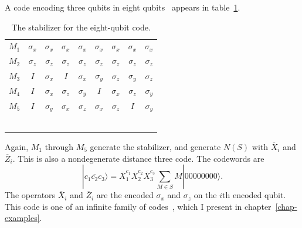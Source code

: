 \documentclass{report}
\newcommand{\ket}[1]{|{#1}\rangle}
\newcommand{\X}{\sigma_x}
\newcommand{\Z}{\sigma_z}
\newcommand{\Y}{\sigma_y}
\newcommand{\Xbar}{\overline{X}}
\newcommand{\Zbar}{\overline{Z}}
\newcommand{\Sum}{\sum}
\newcommand{\low}[1]{\raisebox{-0.3ex}{{#1}}}
\begin{document}
A code encoding three qubits in eight 
qubits~\cite{gottesman-stab,calderbank-stab,steane-8qubit} appears in 
table~\ref{table-8qubit}.
\begin{table}
\centering
\begin{tabular}{c|cccccccc}
$M_1$ & $\X$ & $\X$ & $\X$ & $\X$ & $\X$ & $\X$ & $\X$ & $\X$ \\
$M_2$ & $\Z$ & $\Z$ & $\Z$ & $\Z$ & $\Z$ & $\Z$ & $\Z$ & $\Z$ \\
$M_3$ & $I$ & $\X$ & $I$ & $\X$ & $\Y$ & $\Z$ & $\Y$ & $\Z$ \\
$M_4$ & $I$ & $\X$ & $\Z$ & $\Y$ & $I$ & $\X$ & $\Z$ & $\Y$ \\
$M_5$ & $I$ & $\Y$ & $\X$ & $\Z$ & $\X$ & $\Z$ & $I$ & $\Y$ \\
\hline
\low{$\Xbar_1$} & \low{$\X$} & \low{$\X$} & \low{$I$} & \low{$I$} & \low{$I$} & 
\low{$\Z$} & \low{$I$} & \low{$\Z$} \\
\low{$\Xbar_2$} & \low{$\X$} & \low{$I$} & \low{$\X$} & \low{$\Z$} & \low{$I$} 
& \low{$I$} & \low{$\Z$} & \low{$I$} \\
\low{$\Xbar_3$} & \low{$\X$} & \low{$I$} & \low{$I$} & \low{$\Z$} & \low{$\X$} 
& \low{$\Z$} & \low{$I$} & \low{$I$} \\
\low{$\Zbar_1$} & \low{$I$} & \low{$\Z$} & \low{$I$} & \low{$\Z$} & \low{$I$} & 
\low{$\Z$} & \low{$I$} & \low{$\Z$} \\
\low{$\Zbar_2$} & \low{$I$} & \low{$I$} & \low{$\Z$} & \low{$\Z$} & \low{$I$} & \low{$I$} & \low{$\Z$} & \low{$\Z$} \\
\low{$\Zbar_3$} & \low{$I$} & \low{$I$} & \low{$I$} & \low{$I$} & \low{$\Z$} & 
\low{$\Z$} & \low{$\Z$} & \low{$\Z$}
\end{tabular}
\caption{The stabilizer for the eight-qubit code.}
\label{table-8qubit}
\end{table}
Again, $M_1$ through $M_5$ generate the stabilizer, and generate $N(S)$ with 
$\Xbar_i$ and $\Zbar_i$.  This is also a nondegenerate distance three 
code.  The codewords are
\begin{equation}
\ket{\overline{c_1 c_2 c_3}} = \Xbar_1^{c_1} \Xbar_2^{c_2} \Xbar_3^{c_3} 
\Sum_{M \in S} M \ket{00000000}.
\end{equation}
The operators $\Xbar_i$ and $\Zbar_i$ are the encoded $\X$ and $\Z$ on 
the $i$th encoded qubit.  This code is one of an infinite family of 
codes~\cite{gottesman-stab,steane-RM}, which I present in 
chapter~\ref{chap-examples}.
\end{document}
